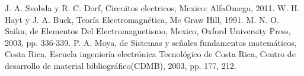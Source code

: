 \documentclass[journal]{IEEEtran}
\begin{document}


%
%
%
\begin{thebibliography}{1}

J. A. Svobda y R. C. Dorf, Circuitos electricos, Mexico: AlfaOmega, 2011.
W. H. Hayt y J. A. Buck, Teoría Electromagnética, Mc Graw Hill, 1991. 
M. N. O. Saiku, de Elementos Del Electromagnetismo, Mexico, Oxford University Press, 2003, pp. 336-339.
P. A. Moya, de Sistemas y señales fundamentos matemáticos, Costa Rica, Escuela ingeniería electrónica Tecnológico de Costa Rica, Centro de desarrollo de material bibliográfico(CDMB), 2003, pp. 177, 212.
\end{thebibliography}

% 





\end{document}

